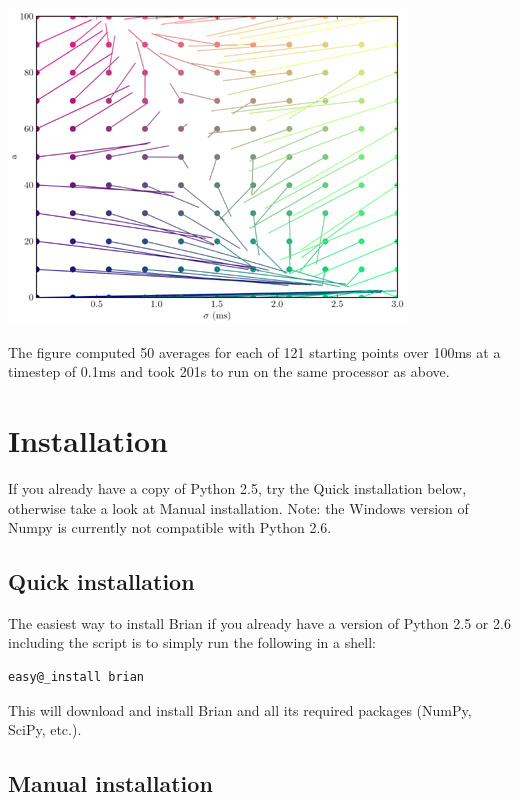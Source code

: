\documentclass[letterpaper,10pt,english]{manual}
\begin{document}
\includegraphics{sfc-statespace.jpg}

The figure computed 50 averages for each of 121 starting points over 100ms at a timestep of 0.1ms and took
201s to run on the same processor as above.

\resetcurrentobjects


\chapter{Installation}

If you already have a copy of Python 2.5, try the Quick installation below,
otherwise take a look at Manual installation.
Note: the Windows version of Numpy is currently not compatible with Python 2.6.


\section{Quick installation}

The easiest way to install Brian if you already have a version of Python 2.5 or 2.6 including the
 script is to simply run the following in a shell:

\begin{Verbatim}[commandchars=@\[\]]
easy@_install brian
\end{Verbatim}

This will download and install Brian and all its required packages (NumPy, SciPy, etc.).


\section{Manual installation}
\end{document}
